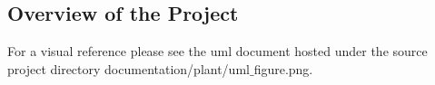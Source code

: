 \documentclass[acmsmall]{acmart}
\newcommand{\csfont}[1]{\fontfamily{cmtt}\selectfont #1}
\begin{document}


\maketitle

\begin{multicols}{2}
    \section{Overview of the Project}
    For a visual reference please see the uml document hosted under the
    source project directory {\csfont{documentation/plant/uml$\_$figure.png}}.

\end{multicols}
\end{document}
